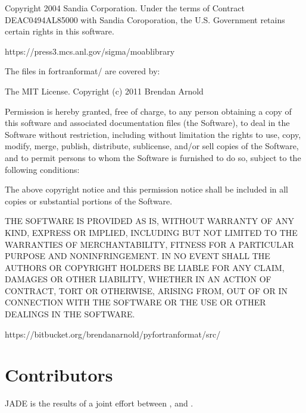 \documentclass[letterpaper,10pt,english]{sphinxmanual}
\begin{document}
\begin{sphinxVerbatim}[commandchars=\\\{\}]
Copyright 2004 Sandia Corporation.  Under the terms of Contract
DE\PYGZhy{}AC04\PYGZhy{}94AL85000 with Sandia Coroporation, the U.S. Government
retains certain rights in this software.

https://press3.mcs.anl.gov/sigma/moab\PYGZhy{}library

\PYGZhy{}\PYGZhy{}\PYGZhy{}\PYGZhy{}\PYGZhy{}\PYGZhy{}\PYGZhy{}\PYGZhy{}\PYGZhy{}\PYGZhy{}\PYGZhy{}\PYGZhy{}\PYGZhy{}\PYGZhy{}\PYGZhy{}\PYGZhy{}\PYGZhy{}\PYGZhy{}\PYGZhy{}\PYGZhy{}\PYGZhy{}\PYGZhy{}\PYGZhy{}\PYGZhy{}\PYGZhy{}\PYGZhy{}\PYGZhy{}\PYGZhy{}\PYGZhy{}\PYGZhy{}\PYGZhy{}\PYGZhy{}\PYGZhy{}\PYGZhy{}\PYGZhy{}\PYGZhy{}\PYGZhy{}\PYGZhy{}\PYGZhy{}\PYGZhy{}\PYGZhy{}\PYGZhy{}\PYGZhy{}\PYGZhy{}\PYGZhy{}\PYGZhy{}\PYGZhy{}\PYGZhy{}\PYGZhy{}\PYGZhy{}\PYGZhy{}\PYGZhy{}\PYGZhy{}\PYGZhy{}\PYGZhy{}\PYGZhy{}\PYGZhy{}\PYGZhy{}\PYGZhy{}\PYGZhy{}\PYGZhy{}\PYGZhy{}\PYGZhy{}\PYGZhy{}\PYGZhy{}\PYGZhy{}\PYGZhy{}\PYGZhy{}\PYGZhy{}\PYGZhy{}\PYGZhy{}\PYGZhy{}\PYGZhy{}\PYGZhy{}\PYGZhy{}\PYGZhy{}\PYGZhy{}\PYGZhy{}\PYGZhy{}
The files in fortranformat/ are covered by: 

The MIT License. Copyright (c) 2011 Brendan Arnold

Permission is hereby granted, free of charge, to any person obtaining a copy
of this software and associated documentation files (the \PYGZdq{}Software\PYGZdq{}), to deal
in the Software without restriction, including without limitation the rights
to use, copy, modify, merge, publish, distribute, sublicense, and/or sell
copies of the Software, and to permit persons to whom the Software is
furnished to do so, subject to the following conditions:

The above copyright notice and this permission notice shall be included in
all copies or substantial portions of the Software.

THE SOFTWARE IS PROVIDED \PYGZdq{}AS IS\PYGZdq{}, WITHOUT WARRANTY OF ANY KIND, EXPRESS OR
IMPLIED, INCLUDING BUT NOT LIMITED TO THE WARRANTIES OF MERCHANTABILITY,
FITNESS FOR A PARTICULAR PURPOSE AND NONINFRINGEMENT. IN NO EVENT SHALL THE
AUTHORS OR COPYRIGHT HOLDERS BE LIABLE FOR ANY CLAIM, DAMAGES OR OTHER
LIABILITY, WHETHER IN AN ACTION OF CONTRACT, TORT OR OTHERWISE, ARISING FROM,
OUT OF OR IN CONNECTION WITH THE SOFTWARE OR THE USE OR OTHER DEALINGS IN
THE SOFTWARE.

https://bitbucket.org/brendanarnold/py\PYGZhy{}fortranformat/src/
\end{sphinxVerbatim}


\chapter{Contributors}
\label{\detokenize{contributors:contributors}}\label{\detokenize{contributors::doc}}
JADE is the results of a joint effort between ,
and .
\end{document}
